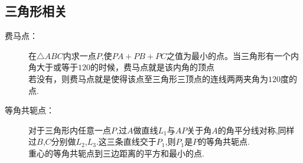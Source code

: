 \subsection{三角形相关}
	\begin{description}
	    \item[费马点：]
		在$\triangle ABC$内求一点$P$,使$PA+PB+PC$之值为最小的点。当三角形有一个内角大于或等于$120$的时候，费马点就是该内角的顶点\\
		若没有，则费马点就是使得该点至三角形三顶点的连线两两夹角为$120$度的点.\\
	    \item[等角共轭点：]
		对于三角形内任意一点$P$,过$A$做直线$L_1$与$AP$关于角$A$的角平分线对称,同样过$B$,$C$分别做$L_2$,$L_3$.这三条直线交于$P_1$,则$P_1$是$P$的等角共轭点.\\
		重心的等角共轭点到三边距离的平方和最小的点.\\
	\end{description}
